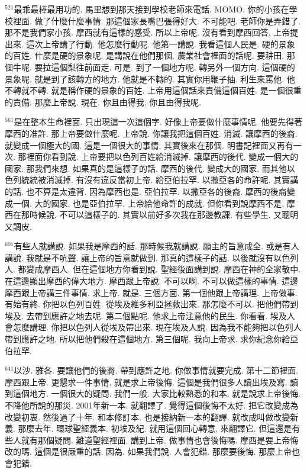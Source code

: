 \documentclass{book}
\begin{document}
$^{521}$最乖最棒最用功的.
馬里想到那天接到學校老師來電話.
MOMO.
你的小孩在學校裡面.
做了什麼什麼事情.
那這個家長嘴巴張得好大.
不可能吧.
老師你是弄錯了.
那不是我們家小孩.
摩西就有這樣的感受.
所以上帝呢.
沒有看到摩西回答.
上帝提出來.
這次上帝講了行動.
他怎麼行動呢.
他第一講說.
我看這個人民是.
硬的景象的百姓.
什麼是硬的景象呢.
是講說在他們那個.
農業社會裡面的話呢.
要耕田.
那個牛呢.
要拉這個梨往前面走.
可是.
到了一個地方呢.
轉另外一個方向.
這個硬的景象呢.
就是到了該轉方的地方.
他就是不轉的.
其實你用鞭子抽.
利生來罵他.
他不轉就不轉.
就是稱作硬的景象的百姓.
上帝用這個話來責備這個百姓.
是一個很重的責備.
那麼上帝說.
現在.
你且由得我.
你且由得我呢.

$^{561}$是在整本生命裡面.
只出現這一次這個字.
好像上帝要做什麼事情呢.
他要先得著摩西的准許.
那上帝要做什麼呢.
上帝說.
你讓我把這個百姓.
消滅.
讓摩西的後裔.
就變成一個極大的國.
這是一個很大的事情.
其實後來在那個.
明書記裡面又再有一次.
那裡面你看到說.
上帝要把以色列百姓給消滅掉.
讓摩西的後代.
變成一個大的國家.
那我們來想.
如果真的是這樣子的話.
摩西的後代.
變成大的國家.
而其他以色列統統被消滅掉.
有沒有違反當初上帝.
給亞伯拉罕.
以撒亞各的命許呢.
其實講的話.
也不算是太違背.
因為摩西也是.
亞伯拉罕.
以撒亞各的後裔.
摩西的後裔變成一個.
大的國家.
也是亞伯拉罕.
上帝給他命許的成就.
但你看到說摩西不是.
摩西在那時候說.
不可以這樣子的.
其實以前好多次我在那邊教課.
有些學生.
又聰明又調皮.

$^{601}$有些人就講說.
如果我是摩西的話.
那時候我就講說.
願主的旨意成全.
或是有人講說.
我就是不吭聲.
讓上帝的旨意就做到.
那真的這樣子的話.
以後就沒有以色列人.
都變成摩西人.
但在這個地方你看到說.
聖經後面講到說.
摩西在神的全家敬中.
在這邊顯出摩西的偉大地方.
摩西跟上帝說.
不可以啊.
不可以做這樣的事情.
這邊摩西跟上帝講三件事情.
求上帝.
就是.
三個方面.
第一個他跟上帝講理.
上帝做事.
有始有終.
你把以色列百姓.
從埃及維多利亞拯救出來.
那怎麼不可以.
把他們帶到埃及.
去帶到應許之地去呢.
第二個點呢.
他求上帝注意他的民生.
你看看.
埃及人會怎麼講理.
你把以色列人從埃及帶出來.
現在埃及人說.
因為我不能夠把以色列人帶到應許之地.
所以把他們殺在這個地方.
第三個呢.
我向上帝求.
求你紀念你給亞伯拉罕.

$^{641}$以沙.
雅各.
要讓他們的後裔.
帶到應許之地.
你做事情就要完成.
第十二節裡面.
摩西跟上帝.
更懇求一件事情.
就是求上帝後悔.
這個是我們很多人讀出埃及寫.
讀到這個地方.
一個很大的疑問.
我們一般.
大家比較熟悉的和本.
就是說求上帝後悔.
不降他所說的那災.
2001年新一本.
就翻譯了.
覺得這個後悔不太好.
把它改變成為改變初衷.
然後過了十年.
和本修訂本.
也是接納新一本的翻譯.
就改成叫做改變新義.
那麼去年.
環球聖經義本.
初埃及紀.
就用這個回心轉意.
來翻譯它.
但這還是有些人就有那個疑問.
難道聖經裡面.
講到上帝.
做事情也會後悔嗎.
摩西是要上帝悔改的嗎.
這個是很嚴重的話.
因為.
如果我們說.
人會犯錯.
那麼要後悔.
那麼上帝也會犯錯.
\end{document}
